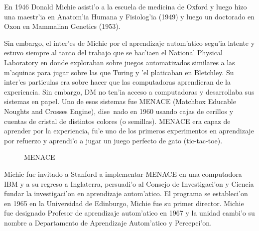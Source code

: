 \documentclass[11pt]{article}
\begin{document}
En 1946 Donald Michie asisti'o a la escuela de medicina de Oxford y luego hizo una maestr'ia en Anatom'ia Humana y Fisiolog'ia (1949) y luego un doctorado en Oxon en Mammalian Genetics (1953).

Sin embargo, el inter'es de Michie por el aprendizaje autom'atico segu'ia latente y estuvo siempre al tanto del trabajo que se hac'iaen el National Physical Laboratory en donde exploraban sobre juegos automatizados similares a las m'aquinas para jugar sobre las que Turing y 'el platicaban en Bletchley. Su inter'es particulas era sobre hacer que las computadoras aprendieran de la experiencia. Sin embargo, DM no ten'ia acceso a computadoras y desarrollaba sus sistemas en papel. Uno de esos sistemas fue MENACE (Matchbox Educable Noughts and Crosses Engine), dise~nado en 1960 usando cajas de cerillos y cuentas de cristal de distintos colores (o semillas). MENACE era capaz de aprender por la experiencia, fu'e uno de los primeros experimentos en aprendizaje por refuerzo y aprendi'o a jugar un juego perfecto de gato (tic-tac-toe). 

\begin{figure}[h]

\centering
{}
\caption[MENACE]{MENACE} 
\label{fig:menace}

\end{figure}


Michie fue invitado a Stanford a implementar MENACE en una computadora IBM y a su regreso a Inglaterra, persuadi'o al Consejo de Investigaci'on y Ciencia fundar la investigaci'on en aprendizaje autom'atico. El programa se estableci'on en 1965 en la Universidad de Edinburgo, Michie fue su primer director. Michie fue designado Profesor de aprendizaje autom'atico en 1967 y la unidad cambi'o su nombre a Departamento de Aprendizaje Autom'atico y Percepci'on.
\end{document}
